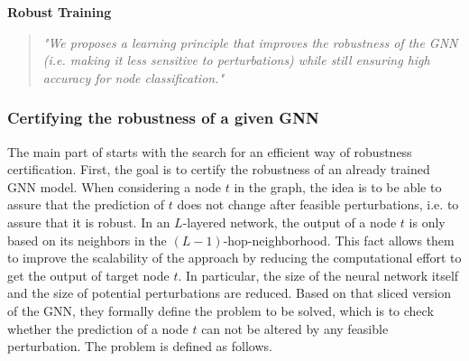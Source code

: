 \documentclass[a4paper,preprint]{sig-alternate}
\begin{document}
\textbf{Robust Training}
\begin{quote}
    \emph{"We proposes a learning principle that improves the robustness of the GNN (i.e. making it less sensitive to perturbations) 
    while still ensuring high accuracy for node classification."} \cite{Zuegner_2019}
\end{quote}

\vfill
\pagebreak

\subsubsection{Certifying the robustness of a given GNN}
\label{subsec:robustness_certification}

The main part of \cite{Zuegner_2019} starts with the search for an efficient way of robustness certification.
First, the goal is to certify the robustness of an already trained GNN model. When considering a node $t$ in the graph, the idea is to be 
able to assure that the prediction of $t$ does not change after feasible perturbations, i.e. to assure that it is robust.
In an $L$-layered network, the output of a node $t$ is only based on its neighbors in the $(L-1)$-hop-neighborhood. \cite{Zuegner_2019}
This fact allows them to improve the scalability of the approach by reducing the computational effort to get the output
of target node $t$. In particular, the size of the neural network itself and the size of potential perturbations are reduced.
Based on that sliced version of the GNN, they formally define the problem to be solved, which is to check whether the prediction 
of a node $t$ can not be altered by any feasible perturbation. The problem is defined as follows.\newline
\end{document}

